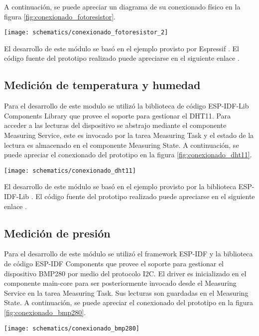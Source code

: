 A continuación, se puede apreciar un diagrama de su conexionado físico en la figura \ref{fig:conexionado_fotoresistor}.

\begin{center}
\texttt{[image: schematics/conexionado\_fotoresistor\_2]}
  \label{fig:conexionado_fotoresistor}
\end{center}

El desarrollo de este módulo se basó en el ejemplo provisto por Espressif \cite{ESP32_ADC1_Example}. El código fuente del prototipo realizado puede apreciarse en el siguiente enlace \cite{ESP32_POC_photoresistor}.

\subsection{Medición de temperatura y humedad}

Para el desarrollo de este modulo se utilizó la biblioteca de código ESP-IDF-Lib Components Library \cite{esp_idf_lib_website} que provee el soporte para gestionar el DHT11. Para acceder a las lecturas del dispositivo se abstrajo mediante el componente Measuring Service, este es invocado por la tarea Measuring Task y el estado de la lectura es almacenado en el componente Measuring State.
A continuación, se puede apreciar el conexionado del prototipo en la figura \ref{fig:conexionado_dht11}.

\begin{center}
\texttt{[image: schematics/conexionado\_dht11]}
  \label{fig:conexionado_dht11}
\end{center}

El desarrollo de este módulo se basó en el ejemplo provisto por la biblioteca ESP-IDF-Lib \cite{ESP32_dht11_example}. El código fuente del prototipo realizado puede apreciarse en el siguiente enlace \cite{ESP32_POC_dht11}.

\subsection{Medición de presión}
Para el desarrollo de este módulo se utilizó el framework ESP-IDF y la biblioteca de código ESP-IDF Components que provee el soporte para gestionar el dispositivo BMP280 por medio del protocolo I2C. El driver es inicializado en el componente main-core para ser posteriormente invocado desde el Measuring Service en la tarea Measuring Task. Sus lecturas son guardadas en el Measuring State. A continuación, se puede apreciar el conexionado del prototipo en la figura \ref{fig:conexionado_bmp280}.
\begin{center}
\texttt{[image: schematics/conexionado\_bmp280]}
  \label{fig:conexionado_bmp280}
\end{center}

